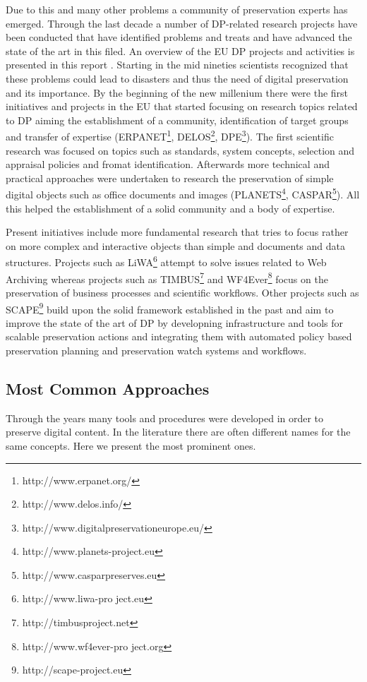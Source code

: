 Due to this and many other problems a community of preservation experts has emerged. Through the last decade a number of DP-related research projects have been conducted that have identified problems and treats and have advanced the state of the art in this filed. An overview of the EU DP projects and activities is presented in this report \cite{strodl:2011:dpreport}. Starting in the mid nineties scientists recognized that these problems could lead to disasters and thus the need of digital preservation and its importance. By the beginning of the new millenium there were the first initiatives and projects in the EU that started focusing on research topics related to DP aiming the establishment of a community, identification of target groups and transfer of expertise (ERPANET\footnote{http://www.erpanet.org/}, DELOS\footnote{http://www.delos.info/}, DPE\footnote{http://www.digitalpreservationeurope.eu/}). The first scientific research was focused on topics such as standards, system concepts, selection and appraisal policies and fromat identification. Afterwards more technical and practical approaches were undertaken to research the preservation of simple digital objects such as office documents and images (PLANETS\footnote{http://www.planets-project.eu}, CASPAR\footnote{http://www.casparpreserves.eu}). All this helped the establishment of a solid community and a body of expertise.

Present initiatives include more fundamental research that tries to focus rather on more complex and interactive objects than simple and documents and data structures. Projects such as LiWA\footnote{http://www.liwa-pro ject.eu} attempt to solve issues related to Web Archiving whereas projects such as TIMBUS\footnote{http://timbusproject.net} and WF4Ever\footnote{http://www.wf4ever-pro ject.org} focus on the preservation of business processes and scientific workflows.
Other projects such as SCAPE\footnote{http://scape-project.eu} build upon the solid framework established in the past and aim to improve the state of the art of DP by developning infrastructure and tools for scalable preservation actions and integrating them with automated policy based preservation planning and preservation watch systems and workflows.
\subsection{Most Common Approaches}
Through the years many tools and procedures were developed in order to preserve digital content. In the literature there are often different names for the same concepts. Here we present the most prominent ones. \newline

